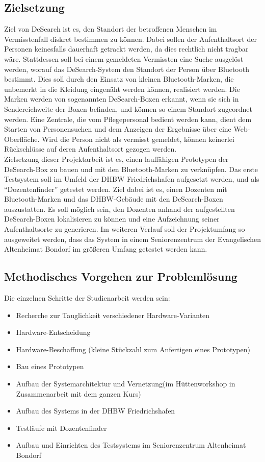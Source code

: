 \subsection{Zielsetzung}
 Ziel von DeSearch ist es, den Standort der betroffenen Menschen im Vermisstenfall diskret bestimmen zu können. Dabei sollen der Aufenthaltsort der Personen keinesfalls dauerhaft getrackt werden, da dies rechtlich nicht tragbar wäre. Stattdessen soll bei einem gemeldeten Vermissten eine Suche ausgelöst werden, worauf das DeSearch-System den Standort der Person über Bluetooth bestimmt. Dies soll durch den Einsatz von kleinen Bluetooth-Marken, die unbemerkt in die Kleidung eingenäht werden können, realisiert werden. Die Marken werden von sogenannten DeSearch-Boxen erkannt, wenn sie sich in Sendereichweite der Boxen befinden, und können so einem Standort zugeordnet werden. Eine Zentrale, die vom Pflegepersonal bedient werden kann, dient dem Starten von Personensuchen und dem Anzeigen der Ergebnisse über eine Web-Oberfläche. Wird die Person nicht als vermisst gemeldet, können keinerlei Rückschlüsse auf deren Aufenthaltsort gezogen werden.
\\Zielsetzung dieser Projektarbeit ist es, einen lauffähigen Prototypen der DeSearch-Box zu bauen und mit den Bluetooth-Marken zu verknüpfen. Das erste Testsystem soll im Umfeld der DHBW Friedrichshafen aufgesetzt werden, und als “Dozentenfinder” getestet werden. Ziel dabei ist es, einen Dozenten mit Bluetooth-Marken und das DHBW-Gebäude mit den DeSearch-Boxen auszustatten. Es soll möglich sein, den Dozenten anhand der aufgestellten DeSearch-Boxen lokalisieren zu können und eine Aufzeichnung seiner Aufenthaltsorte zu generieren.
Im weiteren Verlauf soll der Projektumfang so ausgeweitet werden, dass das System in einem Seniorenzentrum der Evangelischen Altenheimat Bondorf im größeren Umfang getestet werden kann.

\subsection{Methodisches Vorgehen zur Problemlösung}
Die einzelnen Schritte der Studienarbeit werden sein:
\begin{itemize}
\item Recherche zur Tauglichkeit verschiedener Hardware-Varianten
\item Hardware-Entscheidung
\item Hardware-Beschaffung (kleine Stückzahl zum Anfertigen eines Prototypen)
\item Bau eines Prototypen
\item Aufbau der Systemarchitektur und Vernetzung(im Hüttenworkshop in Zusammenarbeit mit dem ganzen Kurs)
\item Aufbau des Systems in der DHBW Friedrichshafen
\item Testläufe mit Dozentenfinder
\item Aufbau und Einrichten des Testsystems im Seniorenzentrum Altenheimat Bondorf
\end{itemize}



